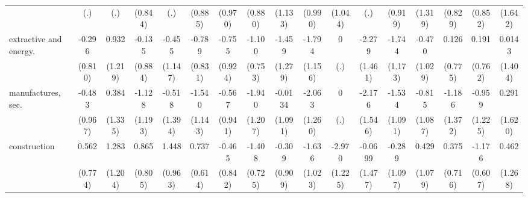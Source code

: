 {\begin{tabular}{l*{16}{c}}
                    &         (.)         &         (.)         &     (0.844)         &         (.)         &     (0.885)         &     (0.970)         &     (0.880)         &     (1.133)         &     (0.990)         &     (1.044)         &         (.)         &     (0.919)         &     (1.319)         &     (0.829)         &     (0.852)         &     (1.642)         \\
[1em]
extractive and energy.&      -0.296         &       0.932         &      -0.135         &      -0.455         &      -0.789         &      -0.755         &      -1.100         &      -1.459         &      -1.794         &           0         &      -2.279         &      -1.744         &      -0.470         &       0.126         &       0.191         &      0.0143         \\
                    &     (0.810)         &     (1.219)         &     (0.884)         &     (1.147)         &     (0.831)         &     (0.924)         &     (0.753)         &     (1.279)         &     (1.156)         &         (.)         &     (1.461)         &     (1.173)         &     (1.029)         &     (0.775)         &     (0.762)         &     (1.404)         \\
[1em]
manufactures, sec.  &      -0.483         &       0.384         &      -1.128         &      -0.518         &      -1.540         &      -0.567         &      -1.940         &     -0.0134         &      -2.063         &           0         &      -2.176         &      -1.534         &      -0.815         &      -1.186         &      -0.959         &       0.291         \\
                    &     (0.967)         &     (1.335)         &     (1.193)         &     (1.394)         &     (1.143)         &     (0.941)         &     (1.207)         &     (1.091)         &     (1.260)         &         (.)         &     (1.546)         &     (1.091)         &     (1.087)         &     (1.372)         &     (1.225)         &     (1.620)         \\
[1em]
construction        &       0.562         &       1.283         &       0.865         &       1.448         &       0.737         &      -0.465         &      -1.408         &      -0.309         &      -1.636         &      -2.970\sym{*}  &     -0.0699         &      -0.289         &       0.429         &       0.375         &      -1.176         &       0.462         \\
                    &     (0.774)         &     (1.204)         &     (0.805)         &     (0.963)         &     (0.614)         &     (0.842)         &     (0.725)         &     (0.909)         &     (1.023)         &     (1.225)         &     (1.477)         &     (1.097)         &     (1.079)         &     (0.716)         &     (0.607)         &     (1.268)         \\

\end{tabular}}
